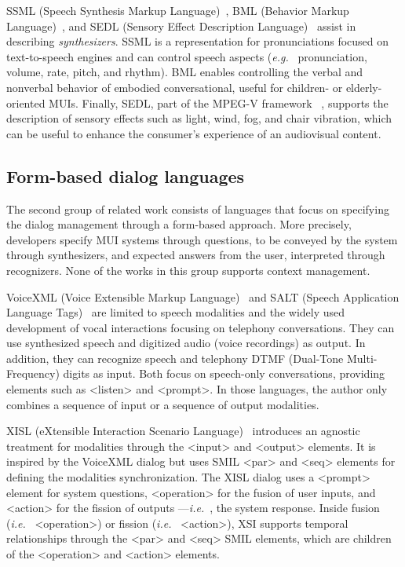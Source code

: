 SSML (Speech Synthesis Markup Language)~\cite{daniel_c._burnett_speech_2010},
BML (Behavior Markup Language)~\cite{vilhjalmsson_behavior_2007}, and SEDL
(Sensory Effect Description Language)~\cite{iso/iec_iso/iec_2013} assist in
describing \textit{synthesizers}. SSML is a representation for pronunciations
focused on text-to-speech engines and can control speech aspects (\textit{e.g.}~
pronunciation, volume, rate, pitch, and rhythm). BML enables controlling the
verbal and nonverbal behavior of embodied conversational, useful for children-
or elderly-oriented MUIs. Finally, SEDL, part of the MPEG-V framework
~\cite{iso/iec_iso/iec_2014}, supports the description of sensory effects such
as light, wind, fog, and chair vibration, which can be useful to enhance the
consumer’s experience of an audiovisual content.

\subsection{Form-based dialog languages}
\label{sec:state:dialog}

The second group of related work consists of languages that focus on specifying
the dialog management through a form-based approach. More precisely, developers
specify MUI systems through questions, to be conveyed by the system through
synthesizers, and expected answers from the user, interpreted through
recognizers. None of the works in this group supports context management.

VoiceXML (Voice Extensible Markup Language)~\cite{w3c_voice_2007} and SALT
(Speech Application Language Tags)~\cite{microsoft_speech_2003} are limited
to speech modalities and the widely used development of vocal interactions
focusing on telephony conversations. They can use synthesized speech and
digitized audio (voice recordings) as output. In addition, they can recognize
speech and telephony DTMF (Dual-Tone Multi-Frequency) digits as input. Both
focus on speech-only conversations, providing elements such as <listen> and
<prompt>. In those languages, the author only combines a sequence of input or a
sequence of output modalities.

XISL (eXtensible Interaction Scenario Language)~\cite{katsurada_xisl:_2005}
introduces an agnostic
treatment for modalities through the <input> and <output> elements. It is
inspired by the VoiceXML dialog but uses SMIL <par> and <seq> elements for
defining the modalities synchronization. The XISL dialog uses a <prompt> element
for system questions, <operation> for the fusion of user inputs, and <action>
for the fission of outputs —\textit{i.e.}~, the system response. Inside fusion (\textit{i.e.}~
<operation>) or fission (\textit{i.e.}~ <action>), XSI supports temporal relationships
through the <par> and <seq> SMIL elements, which are children of the <operation>
and <action> elements.

